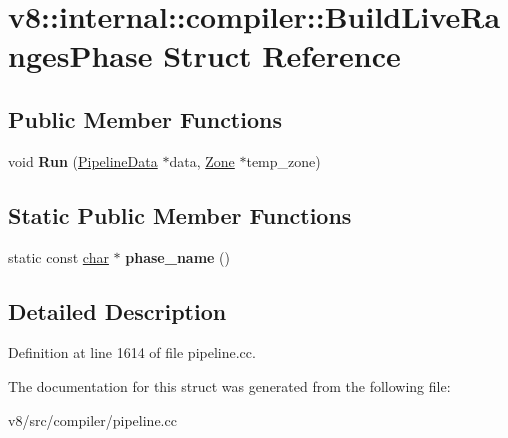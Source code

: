 \hypertarget{structv8_1_1internal_1_1compiler_1_1BuildLiveRangesPhase}{}\section{v8\+:\+:internal\+:\+:compiler\+:\+:Build\+Live\+Ranges\+Phase Struct Reference}
\label{structv8_1_1internal_1_1compiler_1_1BuildLiveRangesPhase}
\subsection*{Public Member Functions}
\begin{DoxyCompactItemize}
\item 
\mbox{\label{structv8_1_1internal_1_1compiler_1_1BuildLiveRangesPhase_ac147364f6efa83b678b0e3307c2aff9f}} 
void {\bfseries Run} (\mbox{\hyperlink{classv8_1_1internal_1_1compiler_1_1PipelineData}{Pipeline\+Data}} $\ast$data, \mbox{\hyperlink{classv8_1_1internal_1_1Zone}{Zone}} $\ast$temp\+\_\+zone)
\end{DoxyCompactItemize}
\subsection*{Static Public Member Functions}
\begin{DoxyCompactItemize}
\item 
\mbox{\label{structv8_1_1internal_1_1compiler_1_1BuildLiveRangesPhase_a67d99c9c44f44b70454409fb8146a498}} 
static const \mbox{\hyperlink{classchar}{char}} $\ast$ {\bfseries phase\+\_\+name} ()
\end{DoxyCompactItemize}


\subsection{Detailed Description}


Definition at line 1614 of file pipeline.\+cc.



The documentation for this struct was generated from the following file\+:\begin{DoxyCompactItemize}
\item 
v8/src/compiler/pipeline.\+cc\end{DoxyCompactItemize}
